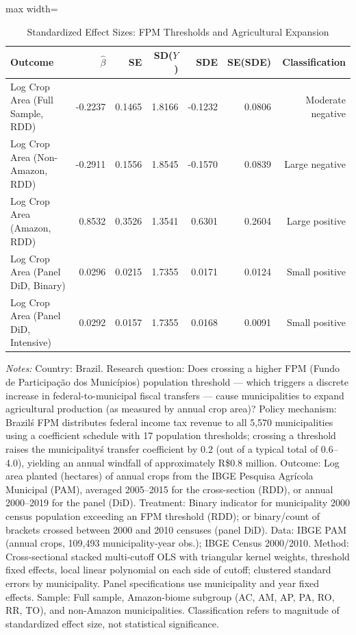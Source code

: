 \begin{table}[htbp]
\small
\centering
\caption{Standardized Effect Sizes: FPM Thresholds and Agricultural Expansion}
\label{tab:tab_sde}
\begin{adjustbox}{max width=\textwidth}
\begin{tabular}{lrrrrrr}
\toprule
Outcome & $\hat{\beta}$ & SE & SD($Y$) & SDE & SE(SDE) & Classification \\
\midrule
Log Crop Area (Full Sample, RDD) & -0.2237 & 0.1465 & 1.8166 & -0.1232 & 0.0806 & Moderate negative \\
Log Crop Area (Non-Amazon, RDD) & -0.2911 & 0.1556 & 1.8545 & -0.1570 & 0.0839 & Large negative \\
Log Crop Area (Amazon, RDD) & 0.8532 & 0.3526 & 1.3541 & 0.6301 & 0.2604 & Large positive \\
Log Crop Area (Panel DiD, Binary) & 0.0296 & 0.0215 & 1.7355 & 0.0171 & 0.0124 & Small positive \\
Log Crop Area (Panel DiD, Intensive) & 0.0292 & 0.0157 & 1.7355 & 0.0168 & 0.0091 & Small positive \\
\bottomrule
\end{tabular}
\end{adjustbox}
\begin{minipage}{0.95\textwidth}
\vspace{4pt}\scriptsize
\textit{Notes:} Country: Brazil. Research question: Does crossing a higher FPM (Fundo de Participa\c{c}\~ao dos Munic\'ipios) population threshold --- which triggers a discrete increase in federal-to-municipal fiscal transfers --- cause municipalities to expand agricultural production (as measured by annual crop area)? Policy mechanism: Brazil\'s FPM distributes federal income tax revenue to all 5,570 municipalities using a coefficient schedule with 17 population thresholds; crossing a threshold raises the municipality\'s transfer coefficient by 0.2 (out of a typical total of 0.6--4.0), yielding an annual windfall of approximately R\$0.8 million. Outcome: Log area planted (hectares) of annual crops from the IBGE Pesquisa Agr\'icola Municipal (PAM), averaged 2005--2015 for the cross-section (RDD), or annual 2000--2019 for the panel (DiD). Treatment: Binary indicator for municipality 2000 census population exceeding an FPM threshold (RDD); or binary/count of brackets crossed between 2000 and 2010 censuses (panel DiD). Data: IBGE PAM (annual crops, 109,493 municipality-year obs.); IBGE Census 2000/2010. Method: Cross-sectional stacked multi-cutoff OLS with triangular kernel weights, threshold fixed effects, local linear polynomial on each side of cutoff; clustered standard errors by municipality. Panel specifications use municipality and year fixed effects. Sample: Full sample, Amazon-biome subgroup (AC, AM, AP, PA, RO, RR, TO), and non-Amazon municipalities. Classification refers to magnitude of standardized effect size, not statistical significance.
\end{minipage}
\end{table}
